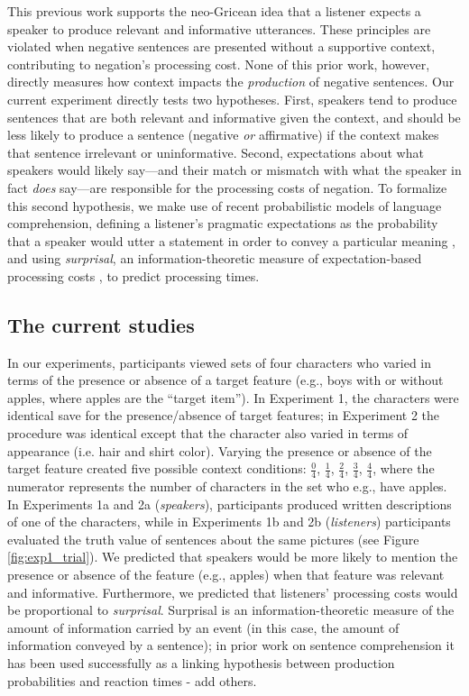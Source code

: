 \documentclass[man, floatsintext, noapacite]{apa6}
\begin{document}
This previous work supports the neo-Gricean idea that a listener expects a speaker to produce relevant and informative utterances. These principles are violated when negative sentences are presented without a supportive context, contributing to negation's processing cost. None of this prior work, however, directly measures how context impacts the \textit{production} of negative sentences. Our current experiment directly tests two hypotheses.  First, speakers tend to produce sentences that are both relevant and informative given the context, and should be less likely to produce a sentence (negative \textit{or} affirmative) if the context makes that sentence irrelevant or uninformative. Second, expectations about what speakers would likely say---and their match or mismatch with what the speaker in fact \textit{does} say---are responsible for the processing costs of negation. To formalize this second hypothesis, we make use of recent probabilistic models of language comprehension, defining a listener's pragmatic expectations as the probability that a speaker would utter a statement in order to convey a particular meaning \cite{frank2012, goodman2016}, and using \textit{surprisal}, an information-theoretic measure of expectation-based processing costs \cite{levy2008}, to predict processing times.  
 
\subsection{The current studies}

In our experiments, participants viewed sets of four characters who varied in terms of the presence or absence of a target feature (e.g., boys with or without apples, where apples are the ``target item''). In Experiment 1, the characters were identical save for the presence/absence of target features; in Experiment 2 the procedure was identical except that the character also varied in terms of appearance (i.e. hair and shirt color). Varying the presence or absence of the target feature created five possible context conditions: $\frac{0}{4}$, $\frac{1}{4}$, $\frac{2}{4}$, $\frac{3}{4}$, $\frac{4}{4}$, where the numerator represents the number of characters in the set who e.g., have apples. In Experiments 1a and 2a (\textit{speakers}), participants produced written descriptions of one of the characters, while in Experiments 1b and 2b (\textit{listeners}) participants evaluated the truth value of sentences about the same pictures (see Figure \ref{fig:exp1_trial}). We predicted that speakers would be more likely to mention the presence or absence of the feature (e.g., apples) when that feature was relevant and informative. Furthermore, we predicted that listeners' processing costs would be proportional to \textit{surprisal}. Surprisal is an information-theoretic measure of the amount of information carried by an event (in this case, the amount of information conveyed by a sentence); in prior work on sentence comprehension it has been used successfully as a linking hypothesis between production probabilities and reaction times \cite{levy2008} - add others. 
\end{document}
